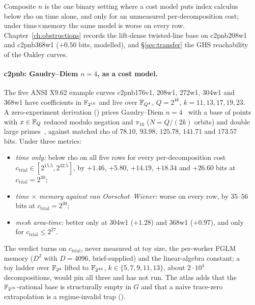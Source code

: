 Composite $n$ is the one binary setting where a cost model puts index
calculus below rho on time alone, and only for an unmeasured
per-decomposition cost; under time$\times$memory the same model is worse on
every row. Chapter~\ref{ch:obstructions} records the lift-dense
twisted-line base on c2pnb208w1 and c2pnb368w1 ($+0.50$ bits, modelled), and
\S\ref{sec:transfer} the GHS reachability of the Oakley curves.

\paragraph{c2pnb: Gaudry--Diem $n=4$, as a cost model.} The five ANSI X9.62
example curves c2pnb176v1, 208w1, 272w1, 304w1 and 368w1 have coefficients in
$\mathbb{F}_{2^{16}}$ and live over $\mathbb{F}_{Q^4}$, $Q=2^{4k}$, $k=11,13,17,19,23$. A
zero-experiment derivation
()
prices Gaudry--Diem $n=4$~\cite{gaudry2009,diem2011} with a base of points
with $x\in\mathbb{F}_Q$ reduced modulo negation and $\pi_{16}$ ($N=Q/(2k)$ orbits)
and double large primes~\cite{gtthd2007}, against matched rho of $78.10$,
$93.98$, $125.78$, $141.71$ and $173.57$ bits. Under three metrics:
\begin{itemize}
\item \emph{time only:} below rho on all five rows for every per-decomposition
  cost $c_{\text{trial}}\in[2^{15.5},2^{32.5}]$, by $+1.46$, $+5.80$, $+14.19$,
  $+18.34$ and $+26.60$ bits at $c_{\text{trial}}=2^{30}$;
\item \emph{time $\times$ memory against van Oorschot--Wiener:} worse on every
  row, by 35--56 bits at $c_{\text{trial}}=2^{30}$;
\item \emph{mesh area-time:} better only at 304w1 ($+1.28$) and 368w1
  ($+0.97$), and only for $c_{\text{trial}}\le2^{27}$.
\end{itemize}
The verdict turns on $c_{\text{trial}}$, never measured at toy size, the
per-worker FGLM memory ($D^2$ with $D=4096$, brief-supplied) and the
linear-algebra constant; a toy ladder over $\mathbb{F}_{2^4}$ lifted to $\mathbb{F}_{2^{4k}}$,
$k\in\{5,7,9,11,13\}$, about $2\cdot10^4$ decompositions, would pin all three
and has not run. The atlas adds that the $\mathbb{F}_{2^{16}}$-rational base is
structurally empty in $G$ and that a naive trace-zero extrapolation is a
regime-invalid trap
().

